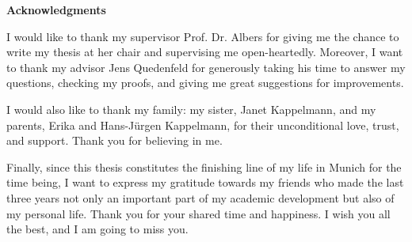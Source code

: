 \thispagestyle{empty}
\vspace*{20mm}

\begin{center}
\textbf{{Acknowledgments}}
\end{center}

\vspace{10mm}
I would like to thank my supervisor Prof. Dr. Albers for giving me the chance to write my thesis at her chair and supervising me open-heartedly. Moreover, I want to thank my advisor Jens Quedenfeld for generously taking his time to answer my questions, checking my proofs, and giving me great suggestions for improvements.

I would also like to thank my family: my sister, Janet Kappelmann, and my parents, Erika and Hans-Jürgen Kappelmann, for their unconditional love, trust, and support. Thank you for believing in me.

Finally, since this thesis constitutes the finishing line of my life in Munich for the time being, I want to express my gratitude towards my friends who made the last three years not only an important part of my academic development but also of my personal life. Thank you for your shared time and happiness. I wish you all the best, and I am going to miss you.

\cleardoublepage{}
